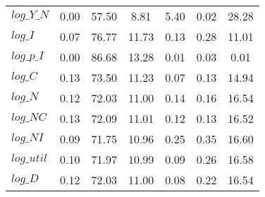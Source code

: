 \begin{center}
\begin{longtable}{lcccccc}
$log\_Y\_N  $	 & 	        0.00	 & 	       57.50	 & 	        8.81	 & 	        5.40	 & 	        0.02	 & 	       28.28 \\ 
$log\_I     $	 & 	        0.07	 & 	       76.77	 & 	       11.73	 & 	        0.13	 & 	        0.28	 & 	       11.01 \\ 
$log\_p\_I  $	 & 	        0.00	 & 	       86.68	 & 	       13.28	 & 	        0.01	 & 	        0.03	 & 	        0.01 \\ 
$log\_C     $	 & 	        0.13	 & 	       73.50	 & 	       11.23	 & 	        0.07	 & 	        0.13	 & 	       14.94 \\ 
$log\_N     $	 & 	        0.12	 & 	       72.03	 & 	       11.00	 & 	        0.14	 & 	        0.16	 & 	       16.54 \\ 
$log\_NC    $	 & 	        0.13	 & 	       72.09	 & 	       11.01	 & 	        0.12	 & 	        0.13	 & 	       16.52 \\ 
$log\_NI    $	 & 	        0.09	 & 	       71.75	 & 	       10.96	 & 	        0.25	 & 	        0.35	 & 	       16.60 \\ 
$log\_util  $	 & 	        0.10	 & 	       71.97	 & 	       10.99	 & 	        0.09	 & 	        0.26	 & 	       16.58 \\ 
$log\_D     $	 & 	        0.12	 & 	       72.03	 & 	       11.00	 & 	        0.08	 & 	        0.22	 & 	       16.54 \\ 
\end{longtable}
 \end{center}
